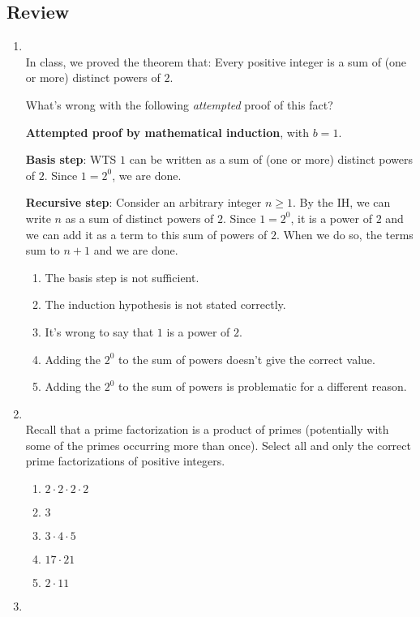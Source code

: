 \documentclass[12pt, oneside]{article}
\begin{document}
\subsection*{Review}
\begin{enumerate}
    \item \hspace{1in} \\ 

In class, we proved the theorem that: 
Every positive integer is a sum of (one or more) distinct powers of $2$.

What's wrong with the following {\it attempted} proof of this fact?


{\bf Attempted proof by mathematical induction}, with $b=1$.

{\bf Basis step}: WTS $1$ can be written 
as a sum of (one or more) distinct powers of $2$. Since $1 =2^0$, 
we are done.

{\bf Recursive step}: Consider an arbitrary integer $n \geq 1$.
By the IH, we can write $n$ as a sum of distinct powers of $2$.
Since $1 = 2^0$, it is a power of $2$ and we can add it as a term 
to this sum of powers of $2$. When we do so, the terms sum to $n+1$
and we are done.

\begin{enumerate}
\item The basis step is not sufficient.
\item The induction hypothesis is not stated correctly.
\item It's wrong to say that $1$ is a power of $2$.
\item Adding the $2^0$ to the sum of powers doesn't give the correct value.
\item Adding the $2^0$ to the sum of powers 
is problematic for a different reason.
\end{enumerate}
     \item \hspace{1in}\\ 


Recall that a prime factorization is a product of primes (potentially with some of the primes
occurring more than once).
Select all and only the correct prime factorizations of positive integers.

\begin{enumerate}
    \item $2\cdot 2 \cdot 2 \cdot 2$
    \item $3$
    \item $3 \cdot 4 \cdot 5$
    \item $17 \cdot 21$
    \item $2 \cdot 11$
\end{enumerate}     \newpage
    \item 


\end{enumerate}
\end{document}
